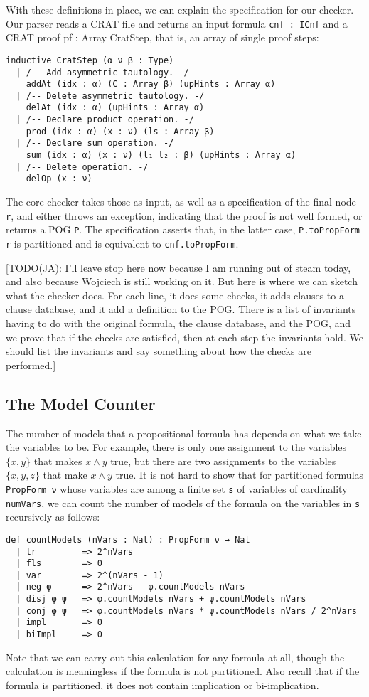 With these definitions in place, we can explain the specification for our checker.
Our parser reads a CRAT file and returns an input formula \lstinline{cnf : ICnf} and a CRAT proof {pf : Array CratStep}, that is, an array of single proof steps:
\begin{lstlisting}
inductive CratStep (α ν β : Type)
  | /-- Add asymmetric tautology. -/
    addAt (idx : α) (C : Array β) (upHints : Array α)
  | /-- Delete asymmetric tautology. -/
    delAt (idx : α) (upHints : Array α)
  | /-- Declare product operation. -/
    prod (idx : α) (x : ν) (ls : Array β)
  | /-- Declare sum operation. -/
    sum (idx : α) (x : ν) (l₁ l₂ : β) (upHints : Array α)
  | /-- Delete operation. -/
    delOp (x : ν)
\end{lstlisting}
The core checker takes those as input, as well as a specification of the final node \lstinline{r}, and either throws an exception, indicating that the proof is not well formed, or returns a POG \lstinline{P}.
The specification asserts that, in the latter case, \lstinline{P.toPropForm r} is partitioned
and is equivalent to \lstinline{cnf.toPropForm}.

[TODO(JA): I'll leave stop here now because I am running out of steam today,
and also because Wojciech is still working on it.
But here is where we can sketch what the checker does.
For each line, it does some checks, it adds clauses to a clause database,
and it add a definition to the POG.
There is a list of invariants having to do with the original formula,
the clause database, and the POG, and we prove that if the checks are satisfied,
then at each step the invariants hold.
We should list the invariants and say something about how the checks are
performed.]

\subsection{The Model Counter}

The number of models that a propositional formula has depends on what we take the
variables to be. For example, there is only one assignment to the variables
$\{ x, y \}$ that makes $x \wedge y$ true, but there are two assignments to the
variables $\{ x, y, z \}$ that make $x \wedge y$ true.
It is not hard to show that for partitioned formulas \lstinline{PropForm ν} whose
variables are among a finite set \lstinline{s} of variables of cardinality \lstinline{numVars},
we can count the number of models of the formula on the variables in \lstinline{s}
recursively as follows:
\begin{lstlisting}
def countModels (nVars : Nat) : PropForm ν → Nat
  | tr         => 2^nVars
  | fls        => 0
  | var _      => 2^(nVars - 1)
  | neg φ      => 2^nVars - φ.countModels nVars
  | disj φ ψ   => φ.countModels nVars + ψ.countModels nVars
  | conj φ ψ   => φ.countModels nVars * ψ.countModels nVars / 2^nVars
  | impl _ _   => 0
  | biImpl _ _ => 0
\end{lstlisting}
Note that we can carry out this calculation for any formula at all, though the
calculation is meaningless if the formula is not partitioned.
Also recall that if the formula is partitioned, it does not contain implication or bi-implication.

